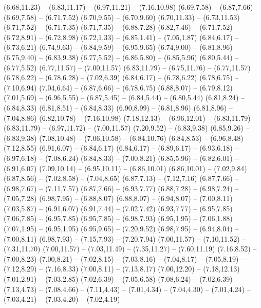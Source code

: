 {  (6.68,11.23) -- (6.83,11.17) -- (6.97,11.21) -- (7.16,10.98)
  (6.69,7.58) -- (6.87,7.66)
  (6.69,7.58) -- (6.71,7.52)
  (6.70,9.55) -- (6.70,9.60)
  (6.70,11.33) -- (6.73,11.53)
  (6.71,7.52) -- (6.71,7.35)
  (6.71,7.35) -- (6.88,7.28)
  (6.82,7.46) -- (6.71,7.52)
  (6.72,8.91) -- (6.72,8.98)
  (6.72,1.33) -- (6.85,1.41) -- (7.05,1.87)
  (6.84,6.17) -- (6.73,6.21)
  (6.74,9.63) -- (6.84,9.59) -- (6.95,9.65)
  (6.74,9.00) -- (6.81,8.96)
  (6.75,9.40) -- (6.83,9.38)
  (6.77,5.52) -- (6.86,5.80) -- (6.85,5.96)
  (6.80,5.44) -- (6.77,5.52)
  (6.77,11.57) -- (7.00,11.57)
  (6.83,11.79) -- (6.75,11.76) -- (6.77,11.57)
  (6.78,6.22) -- (6.78,6.28) -- (7.02,6.39)
  (6.84,6.17) -- (6.78,6.22)
  (6.78,6.75) -- (7.10,6.94)
  (7.04,6.64) -- (6.87,6.66) -- (6.78,6.75)
  (6.88,8.07) -- (6.79,8.12)
  (7.01,5.69) -- (6.96,5.55) -- (6.87,5.45) -- (6.84,5.44) -- (6.80,5.44)
  (6.81,8.24) -- (6.84,8.33)
  (6.81,8.51) -- (6.84,8.33)
  (6.90,8.99) -- (6.81,8.96)
  (6.81,8.96) -- (7.04,8.86)
  (6.82,10.78) -- (7.16,10.98)
  (7.18,12.13) -- (6.96,12.01) -- (6.83,11.79)
  (6.83,11.79) -- (6.97,11.72) -- (7.00,11.57)
  (7.20,9.52) -- (6.83,9.38)
  (6.85,9.26) -- (6.83,9.38)
  (7.08,10.48) -- (7.06,10.58) -- (6.84,10.76)
  (6.84,8.53) -- (6.96,8.48) -- (7.12,8.55)
  (6.91,6.07) -- (6.84,6.17)
  (6.84,6.17) -- (6.89,6.17) -- (6.93,6.18) -- (6.97,6.18) -- (7.08,6.24)
  (6.84,8.33) -- (7.00,8.21)
  (6.85,5.96) -- (6.82,6.01) -- (6.91,6.07)
  (7.09,10.14) -- (6.95,10.11) -- (6.86,10.01)
  (6.86,10.01) -- (7.02,9.84)
  (6.87,8.56) -- (7.02,8.58) -- (7.04,8.65)
  (6.87,7.13) -- (7.12,7.16)
  (6.87,7.66) -- (6.98,7.67) -- (7.11,7.57)
  (6.87,7.66) -- (6.93,7.77)
  (6.88,7.28) -- (6.98,7.24) -- (7.05,7.28)
  (6.98,7.95) -- (6.88,8.07)
  (6.88,8.07) -- (6.94,8.07) -- (7.00,8.11)
  (7.03,5.87) -- (6.91,6.07)
  (6.91,7.44) -- (7.02,7.42)
  (6.93,7.77) -- (6.95,7.85)
  (7.06,7.85) -- (6.95,7.85)
  (6.95,7.85) -- (6.98,7.93)
  (6.95,1.95) -- (7.06,1.88)
  (7.07,1.95) -- (6.95,1.95)
  (6.95,9.65) -- (7.20,9.52)
  (6.98,7.95) -- (6.94,8.04) -- (7.00,8.11)
  (6.98,7.93) -- (7.15,7.93) -- (7.20,7.94)
  (7.00,11.57) -- (7.10,11.52) -- (7.31,11.70)
  (7.00,11.57) -- (7.03,11.49) -- (7.35,11.27) -- (7.60,11.19)
  (7.16,8.52) -- (7.00,8.23)
  (7.00,8.21) -- (7.02,8.15) -- (7.03,8.16) -- (7.04,8.17) -- (7.05,8.19) -- (7.12,8.29) -- (7.16,8.33)
  (7.00,8.11) -- (7.13,8.17)
  (7.00,12.20) -- (7.18,12.13)
  (7.01,2.91) -- (7.03,2.85)
  (7.02,6.39) -- (7.05,6.58)
  (7.08,6.24) -- (7.02,6.39)
  (7.13,4.73) -- (7.08,4.66) -- (7.11,4.43) -- (7.01,4.34) -- (7.04,4.30) -- (7.01,4.24) -- (7.03,4.21) -- (7.03,4.20) -- (7.02,4.19)
}
